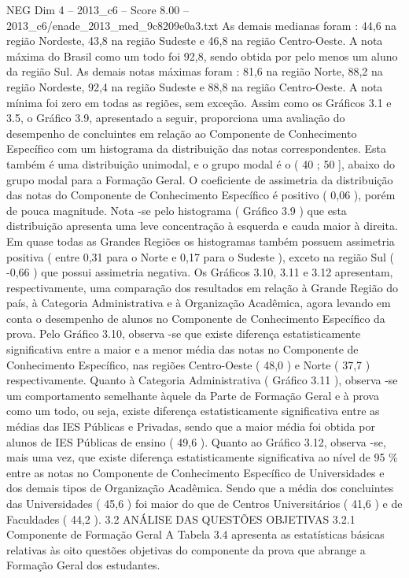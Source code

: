 \begin{textsample}{NEG Dim 4 – 2013\_c6 – Score 8.00 – 2013\_c6/enade\_2013\_med\_9c8209e0a3.txt}
As demais medianas foram : 44,6 na região Nordeste, 43,8 na região Sudeste e 46,8 na região Centro-Oeste.
A nota máxima do Brasil como um todo foi 92,8, sendo obtida por pelo menos um aluno da região Sul.
As demais notas máximas foram : 81,6 na região Norte, 88,2 na região Nordeste, 92,4 na região Sudeste e 88,8 na região Centro-Oeste.
A nota mínima foi zero em todas as regiões, sem exceção.
Assim como os Gráficos 3.1 e 3.5, o Gráfico 3.9, apresentado a seguir, proporciona uma avaliação do desempenho de concluintes em relação ao Componente de Conhecimento Específico com um histograma da distribuição das notas correspondentes.
Esta também é uma distribuição unimodal, e o grupo modal é o ( 40 ; 50 ], abaixo do grupo modal para a Formação Geral.
O coeficiente de assimetria da distribuição das notas do Componente de Conhecimento Específico é positivo ( 0,06 ), porém de pouca magnitude.
Nota -se pelo histograma ( Gráfico 3.9 ) que esta distribuição apresenta uma leve concentração à esquerda e cauda maior à direita.
Em quase todas as Grandes Regiões os histogramas também possuem assimetria positiva ( entre 0,31 para o Norte e 0,17 para o Sudeste ), exceto na região Sul ( -0,66 ) que possui assimetria negativa.
Os Gráficos 3.10, 3.11 e 3.12 apresentam, respectivamente, uma comparação dos resultados em relação à Grande Região do país, à Categoria Administrativa e à Organização Acadêmica, agora levando em conta o desempenho de alunos no Componente de Conhecimento Específico da prova.
Pelo Gráfico 3.10, observa -se que existe diferença estatisticamente significativa entre a maior e a menor média das notas no Componente de Conhecimento Específico, nas regiões Centro-Oeste ( 48,0 ) e Norte ( 37,7 ) respectivamente.
Quanto à Categoria Administrativa ( Gráfico 3.11 ), observa -se um comportamento semelhante àquele da Parte de Formação Geral e à prova como um todo, ou seja, existe diferença estatisticamente significativa entre as médias das IES Públicas e Privadas, sendo que a maior média foi obtida por alunos de IES Públicas de ensino ( 49,6 ).
Quanto ao Gráfico 3.12, observa -se, mais uma vez, que existe diferença estatisticamente significativa ao nível de 95 \% entre as notas no Componente de Conhecimento Específico de Universidades e dos demais tipos de Organização Acadêmica.
Sendo que a média dos concluintes das Universidades ( 45,6 ) foi maior do que de Centros Universitários ( 41,6 ) e de Faculdades ( 44,2 ). 3.2 ANÁLISE DAS QUESTÕES OBJETIVAS 3.2.1 Componente de Formação Geral A Tabela 3.4 apresenta as estatísticas básicas relativas às oito questões objetivas do componente da prova que abrange a Formação Geral dos estudantes.

\end{textsample}
